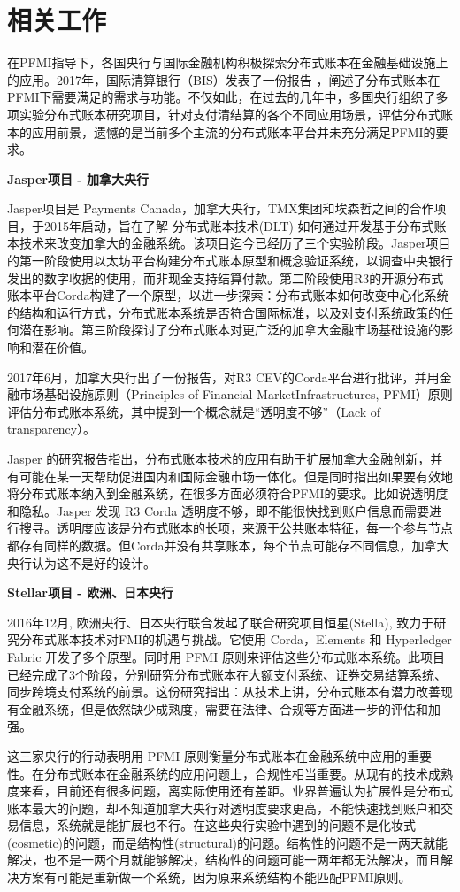 \section{相关工作}\label{sec:related}

在PFMI指导下，各国央行与国际金融机构积极探索分布式账本在金融基础设施上的应用。2017年，国际清算银行（BIS）发表了一份报告 \cite{bis_dlt}，阐述了分布式账本在PFMI下需要满足的需求与功能。不仅如此，在过去的几年中，多国央行组织了多项实验分布式账本研究项目，针对支付清结算的各个不同应用场景，评估分布式账本的应用前景，遗憾的是当前多个主流的分布式账本平台并未充分满足PFMI的要求。

\textbf{Jasper项目 - 加拿大央行}
    
Jasper项目是 Payments Canada，加拿大央行，TMX集团和埃森哲之间的合作项目，于2015年启动，旨在了解 分布式账本技术(DLT) 如何通过开发基于分布式账本技术来改变加拿大的金融系统。该项目迄今已经历了三个实验阶段。Jasper项目的第一阶段使用以太坊平台构建分布式账本原型和概念验证系统，以调查中央银行发出的数字收据的使用，而非现金支持结算付款。第二阶段使用R3的开源分布式账本平台Corda构建了一个原型，以进一步探索：分布式账本如何改变中心化系统的结构和运行方式，分布式账本系统是否符合国际标准，以及对支付系统政策的任何潜在影响。第三阶段探讨了分布式账本对更广泛的加拿大金融市场基础设施的影响和潜在价值。


2017年6月，加拿大央行出了一份报告\cite{jasper1}，对R3 CEV的Corda平台进行批评，并用金融市场基础设施原则（Principles of Financial MarketInfrastructures, PFMI）原则评估分布式账本系统，其中提到一个概念就是“透明度不够”（Lack of transparency）。

Jasper 的研究报告指出，分布式账本技术的应用有助于扩展加拿大金融创新，并有可能在某一天帮助促进国内和国际金融市场一体化。但是同时指出如果要有效地将分布式账本纳入到金融系统，在很多方面必须符合PFMI的要求。比如说透明度和隐私。Jasper 发现 R3 Corda 透明度不够，即不能很快找到账户信息而需要进行搜寻。透明度应该是分布式账本的长项，来源于公共账本特征，每一个参与节点都存有同样的数据。但Corda并没有共享账本，每个节点可能存不同信息，加拿大央行认为这不是好的设计。

\textbf{Stellar项目 - 欧洲、日本央行}

2016年12月, 欧洲央行、日本央行联合发起了联合研究项目恒星(Stella), 致力于研究分布式账本技术对FMI的机遇与挑战。它使用 Corda，Elements 和 Hyperledger Fabric 开发了多个原型。同时用 PFMI 原则来评估这些分布式账本系统。此项目已经完成了3个阶段，分别研究分布式账本在大额支付系统、证券交易结算系统、同步跨境支付系统的前景。这份研究指出：从技术上讲，分布式账本有潜力改善现有金融系统，但是依然缺少成熟度，需要在法律、合规等方面进一步的评估和加强。

这三家央行的行动表明用 PFMI 原则衡量分布式账本在金融系统中应用的重要性。在分布式账本在金融系统的应用问题上，合规性相当重要。从现有的技术成熟度来看，目前还有很多问题，离实际使用还有差距。业界普遍认为扩展性是分布式账本最大的问题，却不知道加拿大央行对透明度要求更高，不能快速找到账户和交易信息，系统就是能扩展也不行。在这些央行实验中遇到的问题不是化妆式(cosmetic)的问题，而是结构性(structural)的问题。结构性的问题不是一两天就能解决，也不是一两个月就能够解决，结构性的问题可能一两年都无法解决，而且解决方案有可能是重新做一个系统，因为原来系统结构不能匹配PFMI原则。
